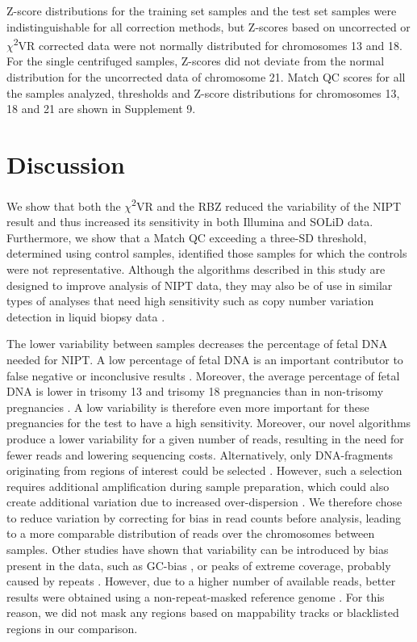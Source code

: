 Z-score distributions for the training set samples and the test set samples were indistinguishable for all correction methods, but Z-scores based on uncorrected or $\chi$\textsuperscript{2}VR corrected data were not normally distributed for chromosomes 13 and 18. 
For the single centrifuged samples, Z-scores did not deviate from the normal distribution for the uncorrected data of chromosome 21. 
Match QC scores for all the samples analyzed, thresholds and Z-score distributions for chromosomes 13, 18 and 21 are shown in Supplement 9.

\section{Discussion}\label{Discussion}
We show that both the $\chi$\textsuperscript{2}VR and the RBZ reduced the variability of the NIPT result and thus increased its sensitivity in both Illumina and SOLiD data. 
Furthermore, we show that a Match QC exceeding a three-SD threshold, determined using control samples, identified those samples for which the controls were not representative. 
Although the algorithms described in this study are designed to improve analysis of NIPT data, they may also be of use in similar types of analyses that need high sensitivity such as copy number variation detection in liquid biopsy data \cite{Chan_2012,Leary_2012}.

The lower variability between samples decreases the percentage of fetal DNA needed for NIPT. 
A low percentage of fetal DNA is an important contributor to false negative or inconclusive results \cite{Mackie_2016}. 
Moreover, the average percentage of fetal DNA is lower in trisomy 13 and trisomy 18 pregnancies than in non-trisomy pregnancies \cite{Wegrzyn_2006,Ashoor_2012a}. 
A low variability is therefore even more important for these pregnancies for the test to have a high sensitivity. 
Moreover, our novel algorithms produce a lower variability for a given number of reads, resulting in the need for fewer reads and lowering sequencing costs. 
Alternatively, only DNA-fragments originating from regions of interest could be selected \cite{Sparks_2012b,Ashoor_2013,Zimmermann_2012}. 
However, such a selection requires additional amplification during sample preparation, which could also create additional variation due to increased over-dispersion \cite{Mutter_1995,Dohm_2008}. 
We therefore chose to reduce variation by correcting for bias in read counts before analysis, leading to a more comparable distribution of reads over the chromosomes between samples. 
Other studies have shown that variability can be introduced by bias present in the data, such as GC-bias \cite{Fan_2008,Chen_2011,Lau_2012,Palomaki_2012,Liang_2013,Fan_2010}, or peaks of extreme coverage, probably caused by repeats \cite{Fan_2010}. 
However, due to a higher number of available reads, better results were obtained using a non-repeat-masked reference genome \cite{Chen_2011,Palomaki_2012}. 
For this reason, we did not mask any regions based on mappability tracks or blacklisted regions in our comparison.

